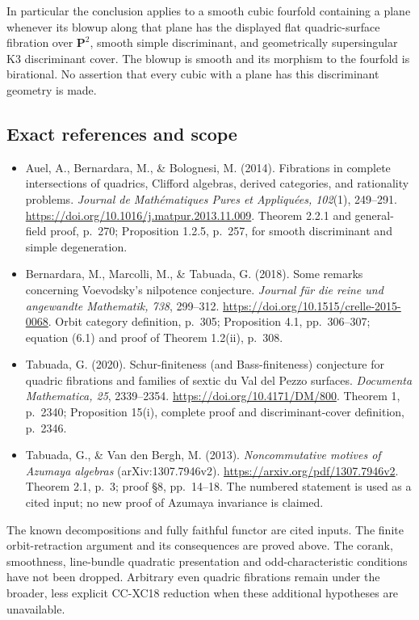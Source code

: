 In particular the conclusion applies to a smooth cubic fourfold
containing a plane whenever its blowup along that plane has the
displayed flat quadric-surface fibration over $\mathbf P^2$, smooth
simple discriminant, and geometrically supersingular K3 discriminant
cover. The blowup is smooth and its morphism to the fourfold is
birational. No assertion that every cubic with a plane has this
discriminant geometry is made.

\subsection{Exact references and scope}
\begin{itemize}
\item Auel, A., Bernardara, M., \& Bolognesi, M. (2014).
Fibrations in complete intersections of quadrics, Clifford algebras,
derived categories, and rationality problems.
\emph{Journal de Math\'ematiques Pures et Appliqu\'ees, 102}(1),
249--291. \url{https://doi.org/10.1016/j.matpur.2013.11.009}.
Theorem 2.2.1 and general-field proof, p.~270; Proposition 1.2.5,
p.~257, for smooth discriminant and simple degeneration.
\item Bernardara, M., Marcolli, M., \& Tabuada, G. (2018).
Some remarks concerning Voevodsky's nilpotence conjecture.
\emph{Journal f\"ur die reine und angewandte Mathematik, 738},
299--312. \url{https://doi.org/10.1515/crelle-2015-0068}.
Orbit category definition, p.~305; Proposition 4.1, pp.~306--307;
equation (6.1) and proof of Theorem 1.2(ii), p.~308.
\item Tabuada, G. (2020). Schur-finiteness (and Bass-finiteness)
conjecture for quadric fibrations and families of sextic du Val del
Pezzo surfaces. \emph{Documenta Mathematica, 25}, 2339--2354.
\url{https://doi.org/10.4171/DM/800}. Theorem 1, p.~2340;
Proposition 15(i), complete proof and discriminant-cover definition,
p.~2346.
\item Tabuada, G., \& Van den Bergh, M. (2013).
\emph{Noncommutative motives of Azumaya algebras}
(arXiv:1307.7946v2). \url{https://arxiv.org/pdf/1307.7946v2}.
Theorem 2.1, p.~3; proof \S8, pp.~14--18. The numbered statement is
used as a cited input; no new proof of Azumaya invariance is claimed.
\end{itemize}

The known decompositions and fully faithful functor are cited inputs.
The finite orbit-retraction argument and its consequences are proved
above. The corank, smoothness, line-bundle quadratic presentation and
odd-characteristic conditions have not been dropped. Arbitrary even
quadric fibrations remain under the broader, less explicit CC-XC18
reduction when these additional hypotheses are unavailable.
